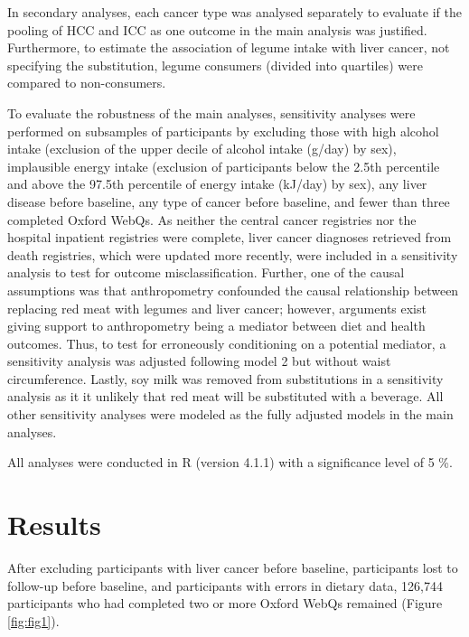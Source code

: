 \documentclass[nutrients,article,submit,moreauthors,pdftex]{Definitions/mdpi}
\begin{document}
In secondary analyses, each cancer type was analysed separately to
evaluate if the pooling of HCC and ICC as one outcome in the main
analysis was justified. Furthermore, to estimate the association of
legume intake with liver cancer, not specifying the substitution, legume
consumers (divided into quartiles) were compared to non-consumers.

To evaluate the robustness of the main analyses, sensitivity analyses
were performed on subsamples of participants by excluding those with
high alcohol intake (exclusion of the upper decile of alcohol intake
(g/day) by sex), implausible energy intake (exclusion of participants
below the 2.5th percentile and above the 97.5th percentile of energy
intake (kJ/day) by sex), any liver disease before baseline, any type of
cancer before baseline, and fewer than three completed Oxford WebQs. As
neither the central cancer registries nor the hospital inpatient
registries were complete, liver cancer diagnoses retrieved from death
registries, which were updated more recently, were included in a
sensitivity analysis to test for outcome misclassification. Further, one
of the causal assumptions was that anthropometry confounded the causal
relationship between replacing red meat with legumes and liver cancer;
however, arguments exist giving support to anthropometry being a
mediator between diet and health outcomes. Thus, to test for erroneously
conditioning on a potential mediator, a sensitivity analysis was
adjusted following model 2 but without waist circumference. Lastly, soy
milk was removed from substitutions in a sensitivity analysis as it it
unlikely that red meat will be substituted with a beverage. All other
sensitivity analyses were modeled as the fully adjusted models in the
main analyses.

All analyses were conducted in R (version 4.1.1) with a significance
level of 5 \%.

\hypertarget{sec3}{%
\section{Results}\label{sec3}}

After excluding participants with liver cancer before baseline,
participants lost to follow-up before baseline, and participants with
errors in dietary data, 126,744 participants who had completed two or
more Oxford WebQs remained (Figure \ref{fig:fig1}).
\end{document}
